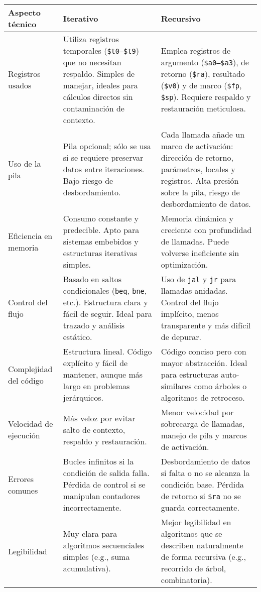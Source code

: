 \documentclass{article}
\begin{document}
\renewcommand{\arraystretch}{1.4}
\begin{center}
\begin{tabular}{|p{3.3cm}|p{5.7cm}|p{5.7cm}|}
\hline
\textbf{Aspecto técnico} & \textbf{Iterativo} & \textbf{Recursivo} \\
\hline
Registros usados & Utiliza registros temporales (\texttt{\$t0--\$t9}) que no necesitan respaldo. Simples de manejar, ideales para cálculos directos sin contaminación de contexto. & Emplea registros de argumento (\texttt{\$a0--\$a3}), de retorno (\texttt{\$ra}), resultado (\texttt{\$v0}) y de marco (\texttt{\$fp}, \texttt{\$sp}). Requiere respaldo y restauración meticulosa. \\
\hline
Uso de la pila & Pila opcional; sólo se usa si se requiere preservar datos entre iteraciones. Bajo riesgo de desbordamiento. & Cada llamada añade un marco de activación: dirección de retorno, parámetros, locales y registros. Alta presión sobre la pila, riesgo de desbordamiento de datos. \\
\hline
Eficiencia en memoria & Consumo constante y predecible. Apto para sistemas embebidos y estructuras iterativas simples. & Memoria dinámica y creciente con profundidad de llamadas. Puede volverse ineficiente sin optimización. \\
\hline
Control del flujo & Basado en saltos condicionales (\texttt{beq}, \texttt{bne}, etc.). Estructura clara y fácil de seguir. Ideal para trazado y análisis estático. & Uso de \texttt{jal} y \texttt{jr} para llamadas anidadas. Control del flujo implícito, menos transparente y más difícil de depurar. \\
\hline
Complejidad del código & Estructura lineal. Código explícito y fácil de mantener, aunque más largo en problemas jerárquicos. & Código conciso pero con mayor abstracción. Ideal para estructuras auto-similares como árboles o algoritmos de retroceso. \\
\hline
Velocidad de ejecución & Más veloz por evitar salto de contexto, respaldo y restauración. & Menor velocidad por sobrecarga de llamadas, manejo de pila y marcos de activación. \\
\hline
Errores comunes & Bucles infinitos si la condición de salida falla. Pérdida de control si se manipulan contadores incorrectamente. & Desbordamiento de datos si falta o no se alcanza la condición base. Pérdida de retorno si \texttt{\$ra} no se guarda correctamente. \\
\hline
Legibilidad & Muy clara para algoritmos secuenciales simples (e.g., suma acumulativa). & Mejor legibilidad en algoritmos que se describen naturalmente de forma recursiva (e.g., recorrido de árbol, combinatoria). \\
\hline
\end{tabular}
\end{center}
\end{document}
